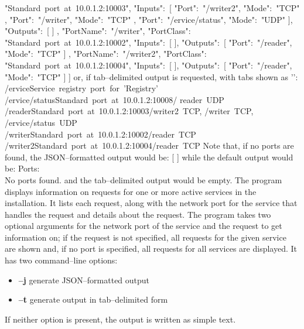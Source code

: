 "Standard~port~at~10.0.1.2:10003", "Inputs":\ [ \textbraceleft{} "Port":\ "/writer2",
"Mode":\ "TCP" \textbraceright{}, \textbraceleft{} "Port":\ "/writer", "Mode":\ "TCP"
\textbraceright, \textbraceleft{} "Port":\ "/\textdollar{}ervice/status", "Mode":\ "UDP"
\textbraceright{} ], "Outputs":\ [  ] \textbraceright, \textbraceleft{}
"PortName":\ "/writer", "PortClass":\ \\
"Standard~port~at~10.0.1.2:10002", "Inputs":\ [  ], "Outputs":\ [ \textbraceleft{}
"Port":\ "/reader", "Mode":\ "TCP" \textbraceright{} ] \textbraceright{}, \textbraceleft{}
"PortName":\ "/writer2", "PortClass":\ \\
"Standard~port~at~10.0.1.2:10004", "Inputs":\ [  ], "Outputs":\ [ \textbraceleft{}
"Port":\ "/reader", "Mode":\ "TCP" \textbraceright{} ] \textbraceright{} ]
\outputEnd{}
or, if tab--delimited output is requested, with tabs shown as
'\texttt{\boldmath{$\vdash$}}':
\outputBegin{}
/\textdollar{}ervice\pseudotab{}Service~registry~port~for~'Registry'\\		
/\textdollar{}ervice/status\pseudotab{}Standard~port~at~10.0.1.2:10008\pseudotab/%
reader~UDP\\
/reader\pseudotab{}Standard~port~at~10.0.1.2:10003\pseudotab/writer2~TCP,
/writer~TCP,\\
\hspace*{2em}/\textdollar{}ervice/status~UDP\\
/writer\pseudotab{}Standard~port~at~10.0.1.2:10002\pseudotab/reader~TCP\\
/writer2\pseudotab{}Standard~port~at~10.0.1.2:10004\pseudotab/reader~TCP
\outputEnd{}
Note that, if no ports are found, the JSON--formatted output would be:
\outputBegin{}
[  ]
\outputEnd{}
while the default output would be:
\outputBegin{}
Ports:\\
\settowidth{\utilLen}{Por}%
\hspace*{\utilLen}No ports found.
\outputEnd{}
and the tab--delimited output would be empty.
The program  displays information on requests for one or more
active services in the \mplusm{} installation.
It lists each request, along with the \yarp{} network port for the service that handles
the request and details about the request.
The program takes two optional arguments for the \yarp{} network port of the service and
the request to get information on; if the request is not specified, all requests for the
given service are shown and, if no port is specified, all requests for all services are
displayed.
It has two command--line options:
\begin{itemize}
\item \textbf{--j} generate JSON--formatted output
\item \textbf{--t} generate output in tab--delimited form
\end{itemize}
If neither option is present, the output is written as simple text.\\

